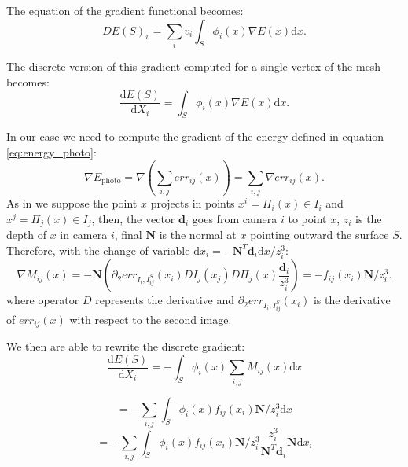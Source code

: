 The equation of the gradient functional becomes:
\begin{equation}
  DE(\mathit{S})_v = \sum_i v_i \int_{\mathit{S}} \phi_i(x) \nabla E(x) \textrm{d}x.
\end{equation}

The discrete version of this gradient computed for a single vertex of the mesh becomes:
\begin{equation}
  \frac{\textrm{d}E(\mathit{S})}{\textrm{d}X_i} =  \int_{\mathit{S}} \phi_i(x) \nabla E(x) \textrm{d}x.
\end{equation}

In our case we need to compute the gradient of the energy defined in equation \eqref{eq:energy_photo}:
\begin{equation}
  \nabla E_{\textrm{photo}} = \nabla (\sum_{i,j} err_{ij}(x)) = \sum_{i,j} \nabla err_{ij}(x).
\end{equation}
As in \cite{pons2007multi} we suppose the point $x$ projects in points $x^i = \Pi_i(x) \in I_i$ and  $x^j = \Pi_j(x) \in I_j$, then, the vector $\mathbf{d}_i$ goes from camera $i$ to point $x$, $z_i$ is the depth of $x$ in camera $i$, final $\mathbf{N}$ is the normal at $x$ pointing outward the surface $\mathit{S}$. 
Therefore, with the change of variable $\textrm{d}x_i = -\mathbf{N}^T \mathbf{d}_i \textrm{d}x/z_i^3$:
\begin{equation}
  \nabla \mathit{M}_{ij}(x) = -\mathbf{N} \left( \partial_2 err_{I_i, I_{ij}^{\mathit{S}}}(x_i) DI_j(x_j) D\Pi_j(x)\frac{\mathbf{d}_i}{z_i^3}\right) = - f_{ij}(x_i) \mathbf{N}/z_i^3.
\end{equation}
where operator $D$ represents the derivative and $\partial_2 err_{I_i, I_{ij}^{\mathit{S}}}(x_i)$ is the derivative of $err_{ij}(x)$ with respect to the second image.


We then are able to rewrite the discrete gradient:
\begin{equation}
  \frac{\textrm{d}E(\mathit{S})}{\textrm{d}X_i} =  - \int_{\mathit{S}} \phi_i(x) \sum_{i,j} \mathit{M}_{ij}(x) \textrm{d}x 
\end{equation}

\begin{equation}
  =  - \sum_{i,j} \int_{\mathit{S}} \phi_i(x)  f_{ij}(x_i)  \mathbf{N}/z_i^3 \textrm{d}x 
\end{equation}
\begin{equation}
  =  - \sum_{i,j} \int_{\mathit{S}} \phi_i(x)  f_{ij}(x_i)  \mathbf{N}/z_i^3 \frac{z_i^3}{\mathbf{N}^T \mathbf{d}_i }\mathbf{N} \textrm{d}x_i
\end{equation}

